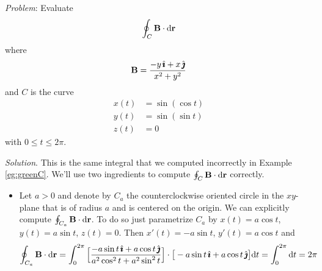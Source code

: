 \begin{eg}\label{eg:greenCC}
\noindent\textit{Problem}:
Evaluate
\begin{equation*}
\oint_C\mathbf{B}\cdot\mathrm{d}\mathbf{r}
\end{equation*}
where
\begin{equation*}
\mathbf{B} = \frac{-y\,\hat{\pmb{\imath}}+x\,\hat{\pmb{\jmath}}}{x^2+y^2}
\end{equation*}
and $C$ is the curve
\begin{align*}
x(t) &= \sin(\cos t) \\
y(t) &= \sin(\sin t) \\
z(t) &= 0
\end{align*}
with $0\le t\le 2\pi$.

\medskip
\noindent\textit{Solution}.
This is the same integral that we computed incorrectly in Example
 \ref{eg:greenC}.
We'll use two ingredients to compute $\oint_C\mathbf{B}\cdot\mathrm{d}\mathbf{r}$
correctly.

\begin{itemize}\itemsep1pt \parskip0pt  %
\item
Let $a>0$ and denote by $C_a$ the counterclockwise oriented circle in 
the $xy$-plane that is of radius $a$ and is centered on the origin. 
We can explicitly compute
$\oint_{C_a}\mathbf{B}\cdot\mathrm{d}\mathbf{r}$. To do so just parametrize 
$C_a$ by $x(t)=a\cos t$, $y(t) = a\sin t$, $z(t)=0$. Then
$x'(t)=-a\sin t$, $y'(t) = a\cos t$ and
\begin{align*}
\oint_{C_a}\mathbf{B}\cdot\mathrm{d}\mathbf{r}
&=\int_0^{2\pi}\Big[\frac{-a\sin t\,\hat{\pmb{\imath}}+a\cos t\,\hat{\pmb{\jmath}}}
                            {a^2\cos^2t+a^2\sin^2t}\Big]
           \cdot\big[-a\sin t\,\hat{\pmb{\imath}}+a\cos t\,\hat{\pmb{\jmath}}\big]
           \mathrm{d}t
=\int_0^{2\pi}\mathrm{d}t=2\pi
\end{align*}


\end{itemize}
\end{eg}
